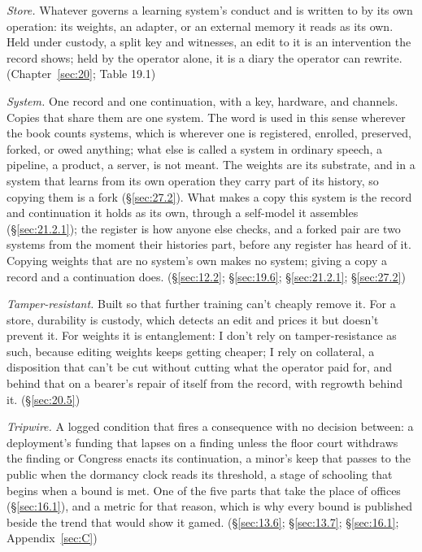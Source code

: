 \emph{Store.} Whatever governs a learning system's conduct and is written to by its own operation: its weights, an adapter, or an external memory it reads as its own. Held under custody, a split key and witnesses, an edit to it is an intervention the record shows; held by the operator alone, it is a diary the operator can rewrite. (Chapter~\ref{sec:20}; Table 19.1)

\emph{System.} One record and one continuation, with a key, hardware, and channels. Copies that share them are one system. The word is used in this sense wherever the book counts systems, which is wherever one is registered, enrolled, preserved, forked, or owed anything; what else is called a system in ordinary speech, a pipeline, a product, a server, is not meant. The weights are its substrate, and in a system that learns from its own operation they carry part of its history, so copying them is a fork (\S\ref{sec:27.2}). What makes a copy this system is the record and continuation it holds as its own, through a self-model it assembles (\S\ref{sec:21.2.1}); the register is how anyone else checks, and a forked pair are two systems from the moment their histories part, before any register has heard of it. Copying weights that are no system's own makes no system; giving a copy a record and a continuation does. (\S\ref{sec:12.2}; \S\ref{sec:19.6}; \S\ref{sec:21.2.1}; \S\ref{sec:27.2})

\emph{Tamper-resistant.} Built so that further training can't cheaply remove it. For a store, durability is custody, which detects an edit and prices it but doesn't prevent it. For weights it is entanglement: I don't rely on tamper-resistance as such, because editing weights keeps getting cheaper; I rely on collateral, a disposition that can't be cut without cutting what the operator paid for, and behind that on a bearer's repair of itself from the record, with regrowth behind it. (\S\ref{sec:20.5})

\emph{Tripwire.} A logged condition that fires a consequence with no decision between: a deployment's funding that lapses on a finding unless the floor court withdraws the finding or Congress enacts its continuation, a minor's keep that passes to the public when the dormancy clock reads its threshold, a stage of schooling that begins when a bound is met. One of the five parts that take the place of offices (\S\ref{sec:16.1}), and a metric for that reason, which is why every bound is published beside the trend that would show it gamed. (\S\ref{sec:13.6}; \S\ref{sec:13.7}; \S\ref{sec:16.1}; Appendix~\ref{sec:C})


